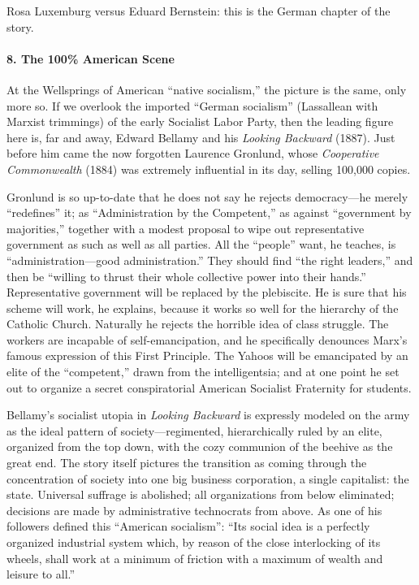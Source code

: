 Rosa Luxemburg versus Eduard Bernstein: this is the German chapter of the story.

\paragraph{8. The 100\% American Scene}

At the Wellsprings of American ``native socialism,'' the picture is the same, only more so. If we overlook the imported ``German socialism'' (Lassallean with Marxist trimmings) of the early Socialist Labor Party, then the leading figure here is, far and away, Edward Bellamy and his \emph{Looking Backward} (1887). Just before him came the now forgotten Laurence Gronlund, whose \emph{Cooperative Commonwealth} (1884) was extremely influential in its day, selling 100,000 copies.

Gronlund is so up-to-date that he does not say he rejects democracy---he merely ``redefines'' it; as ``Administration by the Competent,'' as against ``government by majorities,'' together with a modest proposal to wipe out representative government as such as well as all parties. All the ``people'' want, he teaches, is ``administration---good administration.'' They should find ``the right leaders,'' and then be ``willing to thrust their whole collective power into their hands.'' Representative government will be replaced by the plebiscite. He is sure that his scheme will work, he explains, because it works so well for the hierarchy of the Catholic Church. Naturally he rejects the horrible idea of class struggle. The workers are incapable of self-emancipation, and he specifically denounces Marx's famous expression of this First Principle. The Yahoos will be emancipated by an elite of the ``competent,'' drawn from the intelligentsia; and at one point he set out to organize a secret conspiratorial American Socialist Fraternity for students.

Bellamy's socialist utopia in \emph{Looking Backward} is expressly modeled on the army as the ideal pattern of society---regimented, hierarchically ruled by an elite, organized from the top down, with the cozy communion of the beehive as the great end. The story itself pictures the transition as coming through the concentration of society into one big business corporation, a single capitalist: the state. Universal suffrage is abolished; all organizations from below eliminated; decisions are made by administrative technocrats from above. As one of his followers defined this ``American socialism'': ``Its social idea is a perfectly organized industrial system which, by reason of the close interlocking of its wheels, shall work at a minimum of friction with a maximum of wealth and leisure to all.''

